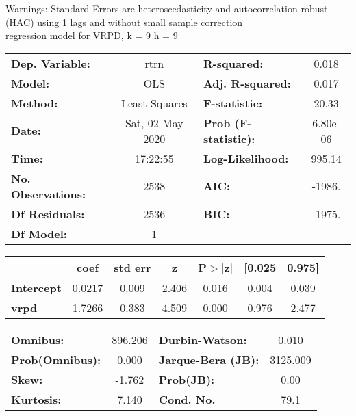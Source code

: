Warnings: \newline
 [1] Standard Errors are heteroscedasticity and autocorrelation robust (HAC) using 1 lags and without small sample correction\\ 

regression model for VRPD, k = 9 h = 9\begin{center}
\begin{tabular}{lclc}
\toprule
\textbf{Dep. Variable:}    &       rtrn       & \textbf{  R-squared:         } &     0.018   \\
\textbf{Model:}            &       OLS        & \textbf{  Adj. R-squared:    } &     0.017   \\
\textbf{Method:}           &  Least Squares   & \textbf{  F-statistic:       } &     20.33   \\
\textbf{Date:}             & Sat, 02 May 2020 & \textbf{  Prob (F-statistic):} &  6.80e-06   \\
\textbf{Time:}             &     17:22:55     & \textbf{  Log-Likelihood:    } &    995.14   \\
\textbf{No. Observations:} &        2538      & \textbf{  AIC:               } &    -1986.   \\
\textbf{Df Residuals:}     &        2536      & \textbf{  BIC:               } &    -1975.   \\
\textbf{Df Model:}         &           1      & \textbf{                     } &             \\
\bottomrule
\end{tabular}
\begin{tabular}{lcccccc}
                   & \textbf{coef} & \textbf{std err} & \textbf{z} & \textbf{P$> |$z$|$} & \textbf{[0.025} & \textbf{0.975]}  \\
\midrule
\textbf{Intercept} &       0.0217  &        0.009     &     2.406  &         0.016        &        0.004    &        0.039     \\
\textbf{vrpd}      &       1.7266  &        0.383     &     4.509  &         0.000        &        0.976    &        2.477     \\
\bottomrule
\end{tabular}
\begin{tabular}{lclc}
\textbf{Omnibus:}       & 896.206 & \textbf{  Durbin-Watson:     } &    0.010  \\
\textbf{Prob(Omnibus):} &   0.000 & \textbf{  Jarque-Bera (JB):  } & 3125.009  \\
\textbf{Skew:}          &  -1.762 & \textbf{  Prob(JB):          } &     0.00  \\
\textbf{Kurtosis:}      &   7.140 & \textbf{  Cond. No.          } &     79.1  \\
\bottomrule
\end{tabular}
\end{center}

